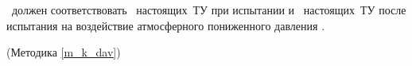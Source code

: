 \dut \  должен соответствовать \treb \ настоящих~ТУ при испытании и \trebafter \ настоящих~ТУ после испытания на воздействие атмосферного пониженного давления \kdav.

\begin{flushright}
	(Методика \ref{m_k_dav})
\end{flushright}

